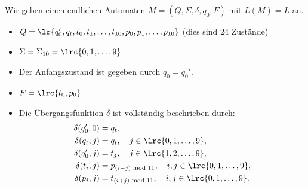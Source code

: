 \begin{myanswer}
Wir geben einen endlichen Automaten $M = (Q, \Sigma, \delta, q_0, F)$ mit $L(M) = L$ an.
\begin{itemize}
    \item $Q = \lr{q_0', q_t, t_0, t_1, \ldots, t_{10}, p_0, p_1, \ldots, p_{10}}$ (dies sind 24 Zustände)
    \item $\Sigma = \Sigma_{10} = \lrc{0, 1, \ldots, 9}$
    \item Der Anfangszustand ist gegeben durch $q_0 = q_0'$.
    \item $F = \lrc{t_0, p_0}$
    \item Die Übergangsfunktion $\delta$ ist vollständig beschrieben durch:
        \begin{align*}
            \delta(q_0', 0) &= q_t, \\
            \delta(q_t, j) &= q_t, \quad j\in\lrc{0, 1, \ldots, 9}, \\
            \delta(q_0', j) &= t_j, \quad j\in\lrc{1, 2, \ldots, 9}, \\
            \delta(t_i, j) &= p_{(i-j)\text{ mod } 11},\quad i,j\in\lrc{0, 1, \ldots, 9}, \\
            \delta(p_i, j) &= t_{(i+j)\text{ mod } 11},\quad i,j\in\lrc{0, 1, \ldots, 9}.
        \end{align*}
\end{itemize}
\end{myanswer}
